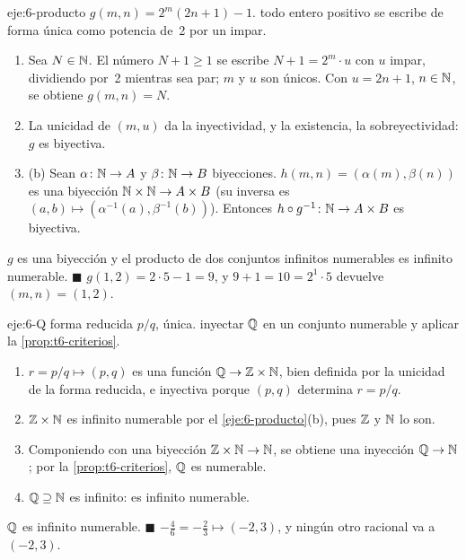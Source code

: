 \begin{solucion}{eje:6-producto}
\datos $g(m,n)=2^{m}(2n+1)-1$.
\planteamiento todo entero positivo se escribe de forma única como potencia de~2 por un impar.
\pasos
\begin{enumerate}[label=\arabic*.]
  \item Sea $N\in\mathbb{N}$. El número $N+1\ge1$ se escribe $N+1=2^{m}\cdot u$ con $u$ impar, dividiendo por~2 mientras sea par; $m$ y $u$ son únicos. Con $u=2n+1$, $n\in\mathbb{N}$, se obtiene $g(m,n)=N$.
  \item La unicidad de $(m,u)$ da la inyectividad, y la existencia, la sobreyectividad: $g$ es biyectiva.
  \item (b) Sean $\alpha\colon\mathbb{N}\to A$ y $\beta\colon\mathbb{N}\to B$ biyecciones. $h(m,n)=(\alpha(m),\beta(n))$ es una biyección $\mathbb{N}\times\mathbb{N}\to A\times B$ (su inversa es $(a,b)\mapsto(\alpha^{-1}(a),\beta^{-1}(b))$). Entonces $h\circ g^{-1}\colon\mathbb{N}\to A\times B$ es biyectiva.
\end{enumerate}
\resultado $g$ es una biyección y el producto de dos conjuntos infinitos numerables es infinito numerable. \hfill$\blacksquare$
\comprobacion $g(1,2)=2\cdot5-1=9$, y $9+1=10=2^{1}\cdot5$ devuelve $(m,n)=(1,2)$.
\end{solucion}

\begin{solucion}{eje:6-Q}
\datos forma reducida $p/q$, única.
\planteamiento inyectar $\mathbb{Q}$ en un conjunto numerable y aplicar la \cref{prop:t6-criterios}.
\pasos
\begin{enumerate}[label=\arabic*.]
  \item $r=p/q\mapsto(p,q)$ es una función $\mathbb{Q}\to\mathbb{Z}\times\mathbb{N}$, bien definida por la unicidad de la forma reducida, e inyectiva porque $(p,q)$ determina $r=p/q$.
  \item $\mathbb{Z}\times\mathbb{N}$ es infinito numerable por el \cref{eje:6-producto}(b), pues $\mathbb{Z}$ y $\mathbb{N}$ lo son.
  \item Componiendo con una biyección $\mathbb{Z}\times\mathbb{N}\to\mathbb{N}$, se obtiene una inyección $\mathbb{Q}\to\mathbb{N}$; por la \cref{prop:t6-criterios}, $\mathbb{Q}$ es numerable.
  \item $\mathbb{Q}\supseteq\mathbb{N}$ es infinito: es infinito numerable.
\end{enumerate}
\resultado $\mathbb{Q}$ es infinito numerable. \hfill$\blacksquare$
\comprobacion $-\tfrac{4}{6}=-\tfrac23\mapsto(-2,3)$, y ningún otro racional va a $(-2,3)$.
\end{solucion}

